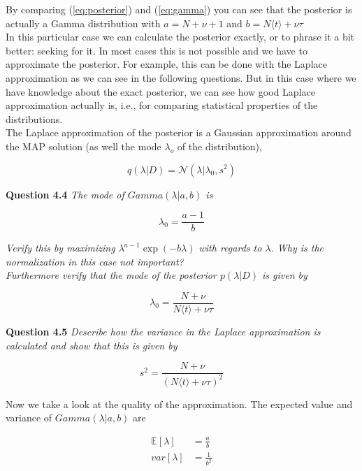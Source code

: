 \documentclass[a4paper]{article}
\begin{document}
By comparing (\ref{eq:posterior}) and (\ref{eq:gamma}) you can see that the posterior is actually a Gamma distribution with $a = N + \nu + 1$ and $b = N \langle t \rangle + \nu \tau$\\

In this particular case we can calculate the posterior exactly, or to phrase it a bit better: seeking for it. In most cases this is not possible and we have to approximate the posterior. For example, this can be done with the Laplace approximation as we can see in the following questions. But in this case where we have knowledge about the exact posterior, we can see how good Laplace approximation actually is, i.e., for comparing statistical properties of the distributions.\\
The Laplace approximation of the posterior is a Gaussian approximation around the MAP solution (as well the mode $\lambda_o$ of the distribution), 

\begin{equation}
	q(\lambda | D) = \mathcal{N}(\lambda | \lambda_0, s^2)
\end{equation}

\textbf{Question 4.4}  \textit{The mode of $Gamma(\lambda | a, b)$ is}

\begin{equation}
	\lambda_0 = \frac{a - 1}{b}
\end{equation}

\textit{Verify this by maximizing $\lambda^{a-1} \exp(-b \lambda)$ with regards to $\lambda$. Why is the normalization in this case not important?\\ Furthermore verify that the mode of the posterior $p(\lambda | D)$ is given by}

\begin{equation}
	\lambda_0 = \frac{N + \nu}{N \langle t \rangle + \nu \tau}
\end{equation}

\textbf{Question 4.5}  \textit{Describe how the variance in the Laplace approximation is calculated and show that this is given by}

\begin{equation}
	s^2 = \frac{N + \nu}{(N \langle t \rangle + \nu \tau)^2}
\end{equation}

Now we take a look at the quality of the approximation. The expected value and variance of $Gamma(\lambda | a, b)$ are

\begin{align*}
	\mathbb{E}[\lambda] &= \frac{a}{b}\\
	var[\lambda] &= \frac{1}{b^2}
\end{align*}
\end{document}
